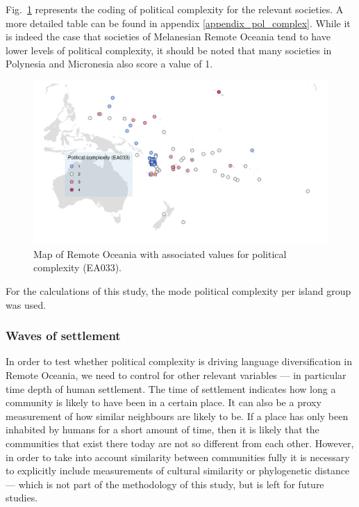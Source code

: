 \documentclass[12pt,letterpaper]{article}
\begin{document}
Fig.~\ref{pol_complex_map} represents the coding of political complexity for the relevant societies. A more detailed table can be found in appendix \ref{appendix_pol_complex}. While it is indeed the case that societies of Melanesian Remote Oceania tend to have lower levels of political complexity, it should be noted that many societies in Polynesia and Micronesia also score a value of 1.

\begin{figure}
\centering
\includegraphics[width=19cm]{map_pol_complex.png}
\caption[Map of Remote Oceania: Political complexity]{{Map of Remote Oceania with associated values for political complexity (EA033).}}
\label{pol_complex_map}
\end{figure}

For the calculations of this study, the mode political complexity per island group was used. 

\FloatBarrier
\subsubsection{Waves of settlement}
\label{appendix_def_dates}
In order to test whether political complexity is driving language diversification in Remote Oceania, we need to control for other relevant variables --- in particular time depth of human settlement. The time of settlement indicates how long a community is likely to have been in a certain place. It can also be a proxy measurement of how similar neighbours are likely to be. If a place has only been inhabited by humans for a short amount of time, then it is likely that the communities that exist there today are not so different from each other. However, in order to take into account similarity between communities fully it is necessary to explicitly include measurements of cultural similarity or phylogenetic distance --- which is not part of the methodology of this study, but is left for future studies.
\end{document}
